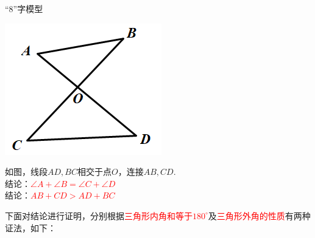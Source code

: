 \begin{custom}[explorecolor]{“8”字模型}
\begin{minipage}{0.3\textwidth}
 \includegraphics[scale=0.3]{figure/bazhi01.PNG}
\end{minipage}
\begin{minipage}{0.6\textwidth}
如图，线段$AD,BC$相交于点$O$，连接$AB,CD$.\\
结论：\textcolor{red}{$\angle A+\angle B=\angle C+\angle D$}\\
结论：\textcolor{red}{$AB+CD>AD+BC$}
\end{minipage}
\end{custom}
下面对结论进行证明，分别根据\textcolor{red}{三角形内角和等于$180^\circ$}及\textcolor{red}{三角形外角的性质}有两种证法，如下：

\begin{minipage}{0.5\textwidth}
\kaishu{}
\end{minipage}
\begin{minipage}{0.5\textwidth}
\kaishu{}
\end{minipage}
